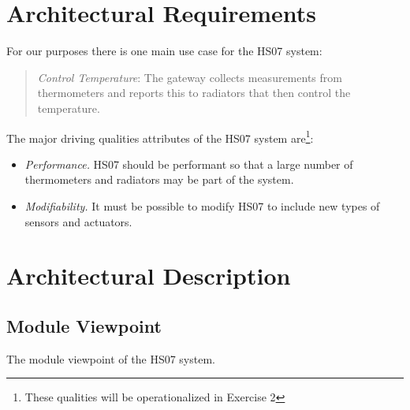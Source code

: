 \documentclass[a4paper,10pt]{article}
\begin{document}
\section{Architectural Requirements}

For our purposes there is one main use case for the HS07 system:
\begin{quote}
  \emph{Control Temperature}: The gateway collects measurements from
  thermometers and reports this to radiators that then control the
  temperature.
\end{quote}

The major driving qualities attributes of the HS07 system
are\footnote{These qualities will be operationalized in Exercise 2}:

\begin{itemize}
\item \emph{Performance.} HS07 should be performant so that a large
  number of thermometers and radiators may be part of the system.
\item \emph{Modifiability.} It must be possible to modify HS07 to
  include new types of sensors and actuators.
\end{itemize}


\section{Architectural Description}

\subsection{Module Viewpoint}

The module viewpoint of the HS07 system.
\end{document}
